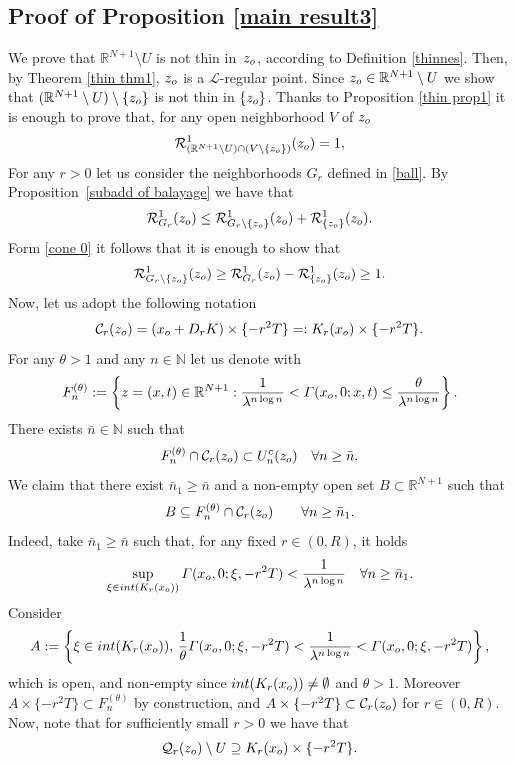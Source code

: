 \documentclass{amsart}
\numberwithin{equation}{section}
\def \R {{\mathbb {R}}}
\def \Lc{{\mathcal{L}}}
\def \r{{\mathbb{R}}}
\def \reduit{{\mathcal{R}}}
\renewcommand{\Gamma}{\varGamma}
\begin{document}
{\subsection{Proof of Proposition \ref{main result3}}
We prove that $\r^{N+1} \setminus U$ is not thin in~$z_{\rm o}$, according to Definition \ref{thinnes}. Then, by Theorem \ref{thin thm1}, $z_{\rm o}$ is a $\Lc$-regular point. Since $z_{\rm o} \in \r^{N+1} \setminus U$ we show that $(\r^{N+1} \setminus U) \setminus \{z_{\rm o}\}$ is not thin in $\{z_{\rm o}\}$.
Thanks to Proposition \ref{thin prop1} it is enough to prove that, for any open neighborhood $V$ of $z_{\rm o}$
\begin{equation}\label{cone 0}
\reduit^1_{(\r^{N+1} \setminus U)\cap (V \setminus \{z_{\rm o}\})} (z_{\rm o}) = 1,
\end{equation}
For any $r>0$ let us consider the neighborhoods $G_r$ defined in \eqref{ball}. By Proposition~\ref{subadd of balayage} we have that
$$
\reduit^1_{G_r}(z_{\rm o}) \leq \reduit^1_{G_r \setminus \{z_{\rm o}\}}(z_{\rm o})+ \reduit^1_{\{z_{\rm o}\}}(z_{\rm o}).
$$
Form \eqref{cone 0} it follows that it is enough to show that
\begin{equation}\label{cone 1}
\reduit^1_{G_r \setminus \{z_{\rm o}\}}(z_{\rm o}) \geq \reduit^1_{G_r}(z_{\rm o}) - \reduit^1_{\{z_{\rm o}\}}(z_{\rm o}) \geq 1.
\end{equation}
Now, let us adopt the following notation 
\[
\mathcal{C}_r(z_{\rm o}) = (x_{\rm o} + D_rK) \times\{-r^2T\} =: K_r(x_{\rm o}) \times\{-r^2T\}.
\]
For any $\theta>1$ and any $n \in \mathbb{N}$ let us denote with
\[
F_n^{(\theta)}:= \left\{z = (x,t) \in \r^{N+1}: \frac{1}{\lambda^{n\log n}}< \Gamma(x_{\rm o},0;x,t) \leq \frac{\theta}{\lambda^{n\log n}}\right\}.
\]
There exists $\bar{n}\in \mathbb{N}$ such that
\begin{equation}\label{cone99}
F_n^{(\theta)}\cap \mathcal{C}_r(z_{\rm o}) \subset U_n^c(z_{\rm o}) \quad \forall n \geq \bar{n}.
\end{equation}
We claim that there exist $\bar{n}_1\geq\bar{n}$ and a non-empty open set $B\subset \R^{N+1}$ such that 
\begin{equation}\label{eq:claim}
B\subseteq F_n^{(\theta)}\cap\mathcal{C}_r(z_{\rm o}) \qquad \forall n\geq\bar{n}_1.
\end{equation}
Indeed, take $\bar{n}_1\geq\bar{n}$ such that, for  any fixed $ r \in (0,R)$, it holds
\[
\sup_{\xi\in {\rm int}(K_r(x_{\rm o}))}{\Gamma(x_{\rm o},0;\xi,-r^2T)}<\frac{1}{\lambda^{n\log n}} \quad\forall n\geq\bar{n}_1.
\]
Consider 
\[
A:=\left\{\xi \in {\rm int}(K_r(x_{\rm o})),\,\frac{1}{\theta}\Gamma(x_{\rm o},0;\xi,-r^2T)<\frac{1}{\lambda^{n\log n}}<\Gamma(x_{\rm o},0;\xi,-r^2T)\right\},
\]
which is open, and non-empty since ${{\rm int}}(K_r(x_{\rm o}))\neq\emptyset$ and $\theta>1$. Moreover $A \times \{-r^2T\} \subset F^{(\theta)}_n$ by construction, and $A \times \{-r^2T\} \subset \mathcal{C}_r(z_{\rm o})$ for $r \in (0,R)$. Now, note that for sufficiently small $r>0$ we have that
\begin{equation}\label{cone 4}
\mathcal{Q}_r(z_{\rm o}) \setminus U \supseteq   K_{r}(x_{\rm o}) \times \{-r^2 T\}.
\end{equation}

}
\end{document}
